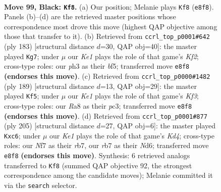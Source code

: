 \documentclass[11pt]{article}
\begin{document}
\clearpage

\begin{figure}[p]\centering
\begin{subfigure}{0.46\textwidth}\centering
\resizebox{\linewidth}{!}{%
\newchessgame
\chessboard[
  setfen={r3k3/1R3n2/P7/6P1/5K2/7P/2P1B3/8 b - - 6 99},
  showmover=false,
  pgfstyle=straightmove, color=movearrow, markmove={e8-f8}
]}
\caption{}
\end{subfigure}\hfill
\begin{subfigure}{0.46\textwidth}\centering
\resizebox{\linewidth}{!}{%
\newchessgame
\chessboard[
  setfen={8/4rk2/2R2n1p/5B2/6P1/5PK1/8/8 b - - 42 92},
  showmover=false,
  pgfstyle=straightmove, color=movearrow, markmove={f7-g7}
]}
\caption{}
\end{subfigure}
\\[4pt]
\begin{subfigure}{0.46\textwidth}\centering
\resizebox{\linewidth}{!}{%
\newchessgame
\chessboard[
  setfen={6R1/5P2/5kn1/2PB4/5P2/2P5/2K5/8 b - - 2 95},
  showmover=false,
  pgfstyle=straightmove, color=movearrow, markmove={f6-f5}
]}
\caption{}
\end{subfigure}\hfill
\begin{subfigure}{0.46\textwidth}\centering
\resizebox{\linewidth}{!}{%
\newchessgame
\chessboard[
  setfen={8/PR6/2Pn4/3k4/3P4/2K5/r7/8 b - - 0 103},
  showmover=false,
  pgfstyle=straightmove, color=movearrow, markmove={d5-c6}
]}
\caption{}
\end{subfigure}
\caption{\textbf{Move 99, Black: \texttt{Kf8}.} (a) Our position; Melanie plays \texttt{Kf8} (\texttt{e8f8}). Panels (b)--(d) are the retrieved master positions whose correspondence most drove this move (highest QAP objective among those that transfer to it). (b) Retrieved from \texttt{ccrl\_top\_p0001\#642} (ply 183) [structural distance $d$=30, QAP obj=40]: the master played \texttt{Kg7}; under $\mu$ our \emph{Ke1} plays the role of that game's \emph{Kf2}; cross-type roles: our \emph{p}h3 as their \emph{b}f5; transferred move \texttt{e8f8} \textbf{(endorses this move)}. (c) Retrieved from \texttt{ccrl\_top\_p0000\#1482} (ply 189) [structural distance $d$=13, QAP obj=29]: the master played \texttt{Kf5}; under $\mu$ our \emph{Ke1} plays the role of that game's \emph{Kf3}; cross-type roles: our \emph{R}a8 as their \emph{p}c3; transferred move \texttt{e8f8} \textbf{(endorses this move)}. (d) Retrieved from \texttt{ccrl\_top\_p0001\#877} (ply 205) [structural distance $d$=27, QAP obj=6]: the master played \texttt{Kxc6}; under $\mu$ our \emph{Ke1} plays the role of that game's \emph{Kd4}; cross-type roles: our \emph{N}f7 as their \emph{r}b7, our \emph{r}b7 as their \emph{N}d6; transferred move \texttt{e8f8} \textbf{(endorses this move)}. Synthesis: 6 retrieved analogs transferred to \texttt{Kf8} (summed QAP objective 92, the strongest correspondence among the candidate moves); Melanie committed it via the \texttt{search} selector.}
\label{fig:thought-m197}
\end{figure}
\end{document}
